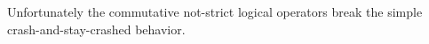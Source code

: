 \documentclass[
]{ceurart}
\begin{document}

Unfortunately the commutative not-strict logical operators break the simple crash-and-stay-crashed behavior.








\end{document}
